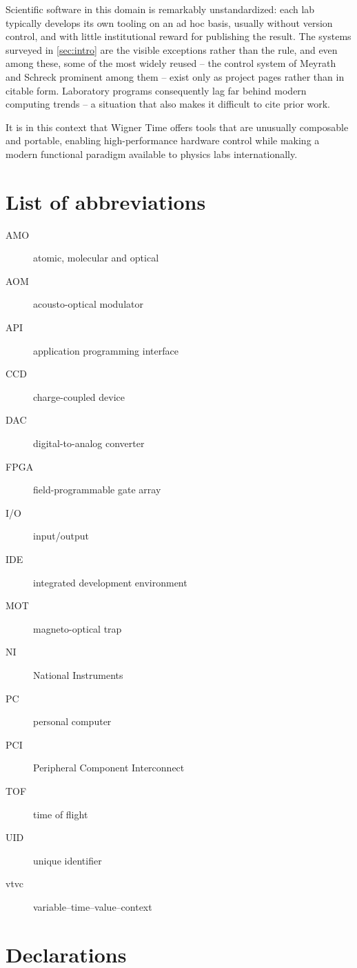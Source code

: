 \documentclass{SciPost}
\begin{document}
Scientific software in this domain is remarkably unstandardized: each lab typically develops its own tooling on an ad hoc basis, usually without version control, and with little institutional reward for publishing the result. The systems surveyed in \cref{sec:intro} are the visible exceptions rather than the rule, and even among these, some of the most widely reused – the control system of Meyrath and Schreck prominent among them \cite{meyrath_schreck_control} – exist only as project pages rather than in citable form. Laboratory programs consequently lag far behind modern computing trends – a situation that also makes it difficult to cite prior work.
 
It is in this context that Wigner Time offers tools that are unusually composable and portable, enabling high-performance hardware control while making a modern functional paradigm available to physics labs internationally.
 
\section*{List of abbreviations}
\begin{description}
\item[AMO] atomic, molecular and optical
\item[AOM] acousto-optical modulator
\item[API] application programming interface
\item[CCD] charge-coupled device
\item[DAC] digital-to-analog converter
\item[FPGA] field-programmable gate array
\item[I/O] input/output
\item[IDE] integrated development environment
\item[MOT] magneto-optical trap
\item[NI] National Instruments
\item[PC] personal computer
\item[PCI] Peripheral Component Interconnect
\item[TOF] time of flight
\item[UID] unique identifier
\item[vtvc] variable–time–value–context
\end{description}

\section*{Declarations}
\end{document}
